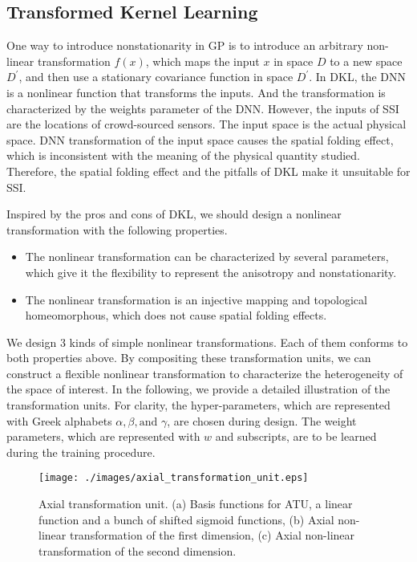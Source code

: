 \documentclass[12pt, draftclsenofoot, oneside, onecolumn]{IEEEtran}
\begin{document}
\subsection{Transformed Kernel Learning}
One way to introduce nonstationarity in GP is to introduce an arbitrary non-linear transformation $f(x)$, which maps the input $x$ in space $D$ to a new space $D^\prime$, and then use a stationary covariance function in space $D^\prime$\cite{Rasmussen2006}. In DKL, the DNN is a nonlinear function that transforms the inputs. And the transformation is characterized by the weights parameter of the DNN. However, the inputs of SSI are the locations of crowd-sourced sensors. The input space is the actual physical space. DNN transformation of the input space causes the spatial folding effect, which is inconsistent with the meaning of the physical quantity studied. Therefore, the spatial folding effect and the pitfalls of DKL make it unsuitable for SSI.

Inspired by the pros and cons of DKL, we should design a nonlinear transformation with the following properties.
\begin{itemize}
  \item The nonlinear transformation can be characterized by several parameters, which give it the flexibility to represent the anisotropy and nonstationarity.
  \item The nonlinear transformation is an injective mapping and topological homeomorphous, which does not cause spatial folding effects.
\end{itemize} 

We design 3 kinds of simple nonlinear transformations. Each of them conforms to both properties above. By compositing these transformation units, we can construct a flexible nonlinear transformation to characterize the heterogeneity of the space of interest. In the following, we provide a detailed illustration of the transformation units. For clarity, the hyper-parameters, which are represented with Greek alphabets $\alpha, \beta, \text{and } \gamma$, are chosen during design. The weight parameters, which are represented with $w$ and subscripts, are to be learned during the training procedure.

\begin{figure}[!tb]
  \centering
  \texttt{[image: ./images/axial\_transformation\_unit.eps]}
  \caption{Axial transformation unit. (a) Basis functions for ATU, a linear function and a bunch of shifted sigmoid functions, (b) Axial non-linear transformation of the first dimension, (c) Axial non-linear transformation of the second dimension.}
  \label{fig:axial_trans_unit}
\end{figure}
\end{document}
